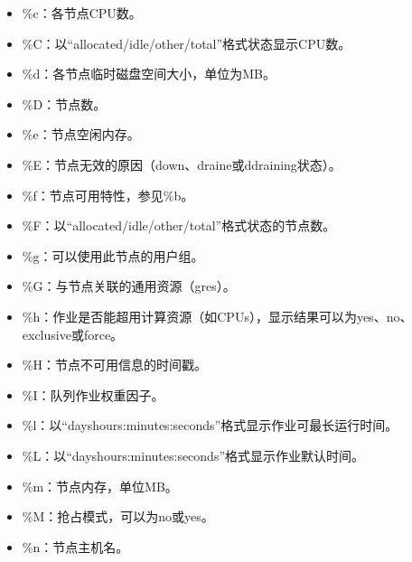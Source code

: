 \documentclass[a4paper,12pt,english]{sphinxmanual}
\begin{document}
\begin{itemize}
\begin{itemize}
\item {} 
\sphinxAtStartPar
\%c：各节点CPU数。

\item {} 
\sphinxAtStartPar
\%C：以“allocated/idle/other/total”格式状态显示CPU数。

\item {} 
\sphinxAtStartPar
\%d：各节点临时磁盘空间大小，单位为MB。

\item {} 
\sphinxAtStartPar
\%D：节点数。

\item {} 
\sphinxAtStartPar
\%e：节点空闲内存。

\item {} 
\sphinxAtStartPar
\%E：节点无效的原因（down、draine或ddraining状态）。

\item {} 
\sphinxAtStartPar
\%f：节点可用特性，参见\%b。

\item {} 
\sphinxAtStartPar
\%F：以“allocated/idle/other/total”格式状态的节点数。

\item {} 
\sphinxAtStartPar
\%g：可以使用此节点的用户组。

\item {} 
\sphinxAtStartPar
\%G：与节点关联的通用资源（gres）。

\item {} 
\sphinxAtStartPar
\%h：作业是否能超用计算资源（如CPUs），显示结果可以为yes、no、exclusive或force。

\item {} 
\sphinxAtStartPar
\%H：节点不可用信息的时间戳。

\item {} 
\sphinxAtStartPar
\%I：队列作业权重因子。

\item {} 
\sphinxAtStartPar
\%l：以“days\sphinxhyphen{}hours:minutes:seconds”格式显示作业可最长运行时间。

\item {} 
\sphinxAtStartPar
\%L：以“days\sphinxhyphen{}hours:minutes:seconds”格式显示作业默认时间。

\item {} 
\sphinxAtStartPar
\%m：节点内存，单位MB。

\item {} 
\sphinxAtStartPar
\%M：抢占模式，可以为no或yes。

\item {} 
\sphinxAtStartPar
\%n：节点主机名。


\end{itemize}
\end{itemize}
\end{document}
